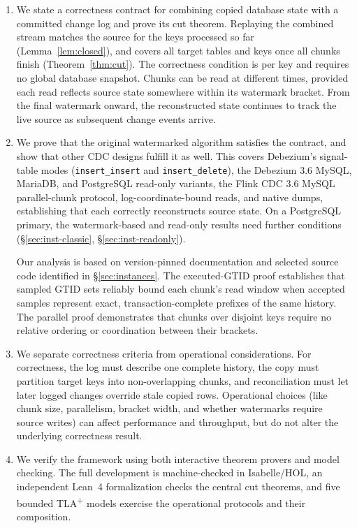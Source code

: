 \documentclass[sigconf,nonacm,10pt]{acmart}
\theoremstyle{plain}
\theoremstyle{definition}
\begin{document}
\begin{enumerate}
\item We state a correctness contract for combining copied database
state with a committed change log and prove its cut theorem. Replaying
the combined stream matches the source for the keys processed so far
(Lemma~\ref{lem:closed}), and covers all target tables and keys
once all chunks finish (Theorem~\ref{thm:cut}). The correctness
condition is per key and requires no global database snapshot. Chunks
can be read at different times, provided each read reflects source state
somewhere within its watermark bracket. From the final watermark onward,
the reconstructed state continues to track the live source as subsequent
change events arrive.

\item We prove that the original watermarked algorithm satisfies the contract,
and show that other CDC designs fulfill it as well.
This covers Debezium's signal-table modes (\texttt{insert\_insert} and
\texttt{insert\_delete}), the Debezium 3.6 MySQL, MariaDB, and PostgreSQL
read-only variants, the Flink CDC 3.6 MySQL parallel-chunk protocol,
log-coordinate-bound reads, and native dumps, establishing that each
correctly reconstructs source state. On a PostgreSQL primary, the
watermark-based and read-only results need further conditions
(\S\ref{sec:inst-classic}, \S\ref{sec:inst-readonly}).

Our analysis is based on version-pinned documentation and selected
source code identified in \S\ref{sec:instances}. The executed-GTID proof
establishes that sampled GTID sets reliably bound each chunk's read
window when accepted samples represent exact, transaction-complete prefixes
of the same history. The parallel proof demonstrates that chunks over
disjoint keys require no relative ordering or coordination between their
brackets.

\item We separate correctness criteria from operational considerations. 
For correctness, the log must describe one complete history, 
the copy must partition target keys into non-overlapping chunks, 
and reconciliation must let later logged changes override stale copied rows. 
Operational choices (like chunk size, parallelism, bracket width,
and whether watermarks require source writes) can affect performance and
throughput, but do not alter the underlying correctness result.

\item We verify the framework using both interactive theorem provers and model checking. 
The full development is machine-checked in Isabelle/HOL, an independent Lean~4 
formalization checks the central cut theorems, and five 
bounded TLA\textsuperscript{+} models exercise the operational 
protocols and their composition.
\end{enumerate}
\end{document}

